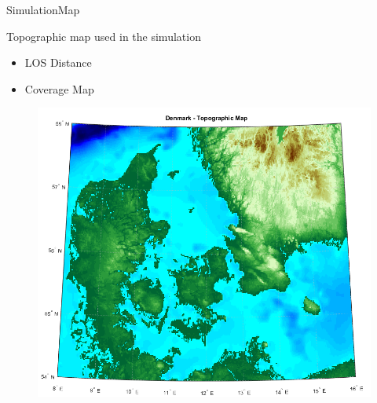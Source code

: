 
\begin{frame}{Simulation}{Map}
  \begin{block}{Topographic map used in the simulation}
  	\begin{itemize}
	 	\item LOS Distance
	  	\item Coverage Map
	\end{itemize}
	\begin{figure}
    	\includegraphics[scale=0.28]{../report/figures/dk_map.png}
    \end{figure}
  \end{block}
\end{frame}

